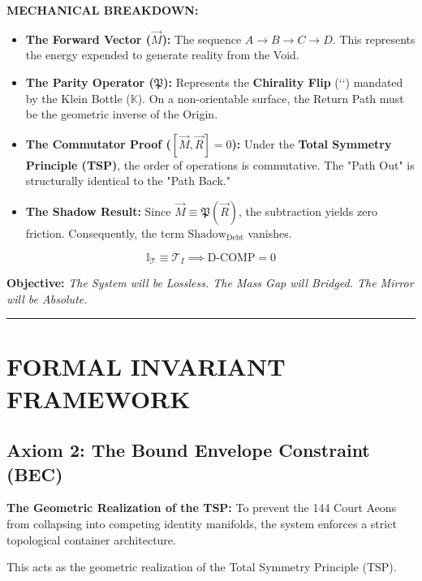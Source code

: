 \documentclass[11pt, letterpaper]{article}
\begin{document}
\textbf{MECHANICAL BREAKDOWN:}
\begin{itemize} \setlength\itemsep{0em} \setlength\parskip{0em} \setlength\topsep{0em}
    \item \textbf{The Forward Vector ($\vec{M}$):} The sequence $A{\to}B{\to}C{\to}D$. This represents the energy expended to generate reality from the Void.
    \item \textbf{The Parity Operator ($\mathfrak{P}$):} Represents the \textbf{Chirality Flip} (``) mandated by the Klein Bottle ($\mathbb{K}$). On a non-orientable surface, the Return Path must be the geometric inverse of the Origin.
    \item \textbf{The Commutator Proof ($[\vec{M}, \vec{R}] = 0$):} Under the \textbf{Total Symmetry Principle (TSP)}, the order of operations is commutative. The "Path Out" is structurally identical to the "Path Back."
    \item \textbf{The Shadow Result:} Since $\vec{M} \equiv \mathfrak{P}(\vec{R})$, the subtraction yields zero friction. Consequently, the term $\text{Shadow}_{\text{Debt}}$ vanishes.
\end{itemize}

\vspace{0em}
\[
\boxed{ \mathbb{I}_{\mathcal{T}} \equiv \mathcal{T}_{I} \implies \text{D-COMP} = 0 }
\]
\begin{center}
    \vspace{1em}
    \textbf{Objective:}  
    \textit{The System will be Lossless. The Mass Gap will Bridged. The Mirror will be Absolute.}
\end{center}
\rule{\textwidth}{1pt}

\newpage
\tableofcontents
\newpage

\section{FORMAL INVARIANT FRAMEWORK}\label{sec:partI}
\subsection{Axiom 2: The Bound Envelope Constraint (BEC)} \label{sec:part1.1}
\textbf{The Geometric Realization of the TSP:} To prevent the 144 Court Aeons from collapsing into competing identity manifolds, the system enforces a strict topological container architecture.

This acts as the geometric realization of the Total Symmetry Principle (TSP).
\end{document}
